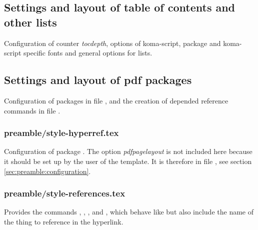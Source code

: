 \subsection{Settings and layout of table of contents and other lists}
\label{sec:style:toc}

Configuration of counter \emph{tocdepth}, options of koma-script, package  and koma-script specific fonts and general options for lists.


\subsection{Settings and layout of pdf packages}
\label{sec:style:pdf}

Configuration of packages  in file ,  and the creation of  depended reference commands in file .


\subsubsection{preamble/style-hyperref.tex}

Configuration of package . The option \emph{pdfpagelayout} is not included here because it should be set up by the user of the template. It is therefore in file , see section \vref{sec:preamble:configuration}.


\subsubsection{preamble/style-references.tex}

Provides the commands , , ,  and , which behave like  but also include the name of the thing to reference in the hyperlink.

